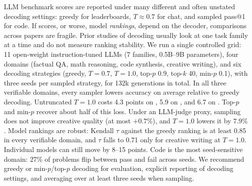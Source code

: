 LLM benchmark scores are reported under many different and often unstated decoding settings: greedy for leaderboards, $T{\approx}0.7$ for chat, and sampled pass@1 for code. If scores, or worse, model \emph{rankings}, depend on the decoder, comparisons across papers are fragile. Prior studies of decoding usually look at one task family at a time and do not measure ranking stability. We run a single controlled grid: 11 open-weight instruction-tuned LLMs (7 families, 0.5B--9B parameters), four domains (factual QA, math reasoning, code synthesis, creative writing), and six decoding strategies (greedy, $T{=}0.7$, $T{=}1.0$, top-$p$ 0.9, top-$k$ 40, min-$p$ 0.1), with three seeds per sampled strategy, for 132k generations in total. In all three verifiable domains, every sampler lowers accuracy on average relative to greedy decoding. Untruncated $T{=}1.0$ costs 4.3 points on \triviaqa, 5.9 on \gsm, and 6.7 on \humaneval. Top-$p$ and min-$p$ recover about half of this loss. Under an LLM-judge proxy, sampling does not improve creative quality (at most $+0.7\%$), and $T{=}1.0$ lowers it by $7.9\%$. Model rankings are robust: Kendall $\tau$ against the greedy ranking is at least 0.85 in every verifiable domain, and $\tau$ falls to 0.71 only for creative writing at $T{=}1.0$. Individual models can still move by 8--15 points. Code is the most seed-sensitive domain: 27\% of problems flip between pass and fail across seeds. We recommend greedy or min-$p$/top-$p$ decoding for evaluation, explicit reporting of decoding settings, and averaging over at least three seeds when sampling.
